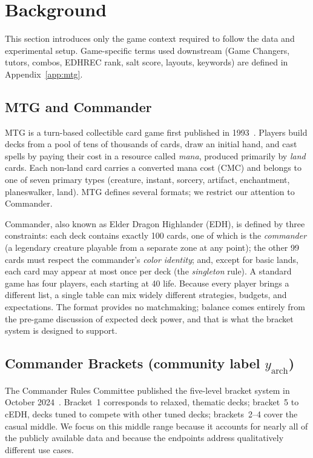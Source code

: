 \documentclass{article}
\begin{document}
\section{Background}
\label{sec:background}

This section introduces only the game context required to follow the data and experimental setup. Game-specific terms used downstream (Game Changers, tutors, combos, EDHREC rank, salt score, layouts, keywords) are defined in Appendix~\ref{app:mtg}.

\subsection{MTG and Commander}
\label{sec:bg:mtg-commander}

MTG is a turn-based collectible card game first published in 1993~\cite{mtg}. Players build decks from a pool of tens of thousands of cards, draw an initial hand, and cast spells by paying their cost in a resource called \textit{mana}, produced primarily by \textit{land} cards. Each non-land card carries a converted mana cost (CMC) and belongs to one of seven primary types (creature, instant, sorcery, artifact, enchantment, planeswalker, land). MTG defines several formats; we restrict our attention to Commander.

Commander, also known as Elder Dragon Highlander (EDH), is defined by three constraints: each deck contains exactly 100 cards, one of which is the \textit{commander} (a legendary creature playable from a separate zone at any point); the other 99 cards must respect the commander's \textit{color identity}; and, except for basic lands, each card may appear at most once per deck (the \textit{singleton} rule). A standard game has four players, each starting at 40 life. Because every player brings a different list, a single table can mix widely different strategies, budgets, and expectations. The format provides no matchmaking; balance comes entirely from the pre-game discussion of expected deck power, and that is what the bracket system is designed to support.

\subsection{Commander Brackets (community label \texorpdfstring{\(y_{\text{arch}}\)}{y\_arch})}
\label{sec:bg:brackets}
The Commander Rules Committee published the five-level bracket system in October 2024~\cite{commanderbrackets}. Bracket~1 corresponds to relaxed, thematic decks; bracket~5 to cEDH, decks tuned to compete with other tuned decks; brackets~2--4 cover the casual middle. We focus on this middle range because it accounts for nearly all of the publicly available data and because the endpoints address qualitatively different use cases.
\end{document}
